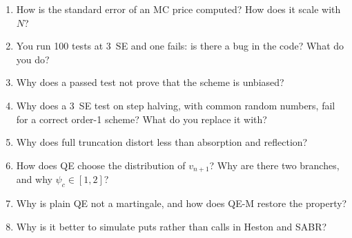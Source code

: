 \begin{domande}
\begin{enumerate}
\item How is the standard error of an MC price computed? How does it scale with $N$?
\item You run 100 tests at 3~SE and one fails: is there a bug in the code? What do you do?
\item Why does a passed test not prove that the scheme is unbiased?
\item Why does a 3~SE test on step halving, with common random numbers, fail for a correct order-1 scheme? What do
you replace it with?
\item Why does full truncation distort less than absorption and reflection?
\item How does QE choose the distribution of $v_{n+1}$? Why are there two branches, and why $\psi_c\in[1,2]$?
\item Why is plain QE not a martingale, and how does QE-M restore the property?
\item Why is it better to simulate puts rather than calls in Heston and SABR?
\end{enumerate}
\end{domande}
